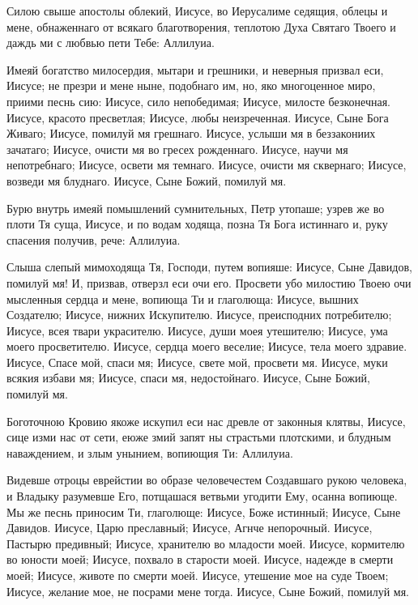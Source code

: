 

Силою
свыше апостолы облекий, Иисусе, во Иерусалиме седящия, облецы и мене, обнаженнаго от всякаго благотворения, теплотою Духа Святаго Твоего и даждь ми с любвью пети Тебе: Аллилуиа.




Имеяй
богатство милосердия, мытари и грешники, и неверныя призвал еси, Иисусе; не презри и мене ныне, подобнаго им, но, яко многоценное миро, приими песнь сию: Иисусе, сило непобедимая; Иисусе, милосте
безконечная. Иисусе, красото пресветлая; Иисусе, любы неизреченная. Иисусе, Сыне Бога Живаго; Иисусе, помилуй мя грешнаго. Иисусе, услыши мя в беззакониих зачатаго; Иисусе, очисти мя во гресех рожденнаго. Иисусе, научи мя непотребнаго; Иисусе, освети мя темнаго. Иисусе, очисти мя сквернаго; Иисусе, возведи мя блуднаго. Иисусе, Сыне Божий, помилуй мя.




Бурю
внутрь имеяй помышлений сумнительных, Петр утопаше; узрев же во плоти Тя суща, Иисусе, и по водам ходяща, позна Тя Бога истиннаго и, руку спасения получив, рече: Аллилуиа. 




Слыша
слепый мимоходяща Тя, Господи, путем вопияше: Иисусе, Сыне Давидов, помилуй мя! И, призвав, отверзл еси очи его. Просвети убо милостию Твоею очи мысленныя сердца и мене, вопиюща Ти и глаголюща: Иисусе, вышних Создателю; Иисусе, нижних Искупителю. Иисусе, преисподних потребителю; Иисусе, всея твари украсителю. Иисусе, души моея утешителю; Иисусе, ума моего просветителю. Иисусе, сердца моего веселие; Иисусе, тела моего здравие. Иисусе, Спасе мой, спаси мя; Иисусе, свете мой, просвети мя. Иисусе, муки всякия избави мя; Иисусе, спаси мя, недостойнаго. Иисусе, Сыне Божий, помилуй мя.




Боготочною
Кровию якоже искупил еси нас древле от законныя клятвы, Иисусе, сице изми нас от сети, еюже змий запят ны страстьми плотскими, и блудным наваждением, и злым унынием, вопиющия Ти: Аллилуиа.




Видевше
отроцы еврейстии во образе человечестем Создавшаго рукою человека, и Владыку разумевше Его, потщашася ветвьми угодити Ему, осанна вопиюще. Мы же песнь приносим Ти, глаголюще: Иисусе, Боже истинный; Иисусе, Сыне Давидов. Иисусе, Царю преславный; Иисусе, Агнче непорочный. Иисусе, Пастырю предивный; Иисусе, хранителю во младости моей. Иисусе, кормителю во юности моей; Иисусе, похвало в старости моей. Иисусе, надежде в смерти моей; Иисусе, животе по смерти моей. Иисусе, утешение мое на суде Твоем; Иисусе, желание мое, не посрами мене тогда. Иисусе, Сыне Божий, помилуй мя.



